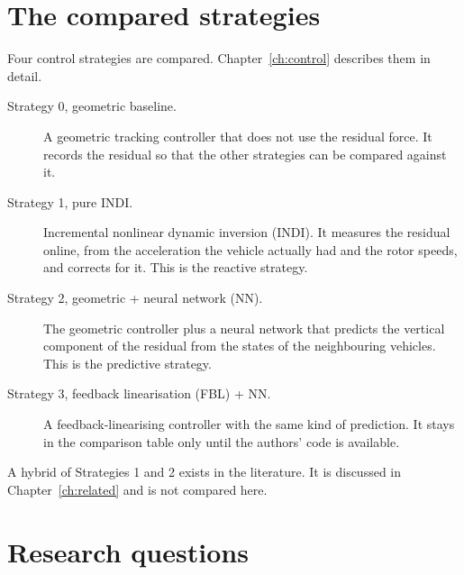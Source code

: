 \section{The compared strategies}
\label{sec:intro-strategies}

Four control strategies are compared. Chapter~\ref{ch:control} describes them in detail.

\begin{description}
  \item[Strategy 0, geometric baseline.] A geometric tracking controller that does not use the
    residual force. It records the residual so that the other strategies can be compared against it.
  \item[Strategy 1, pure INDI.] Incremental nonlinear dynamic inversion (INDI). It measures the
    residual online, from the acceleration the vehicle actually had and the rotor speeds, and
    corrects for it. This is the reactive strategy.
  \item[Strategy 2, geometric + neural network (NN).] The geometric controller plus a neural network
    that predicts the vertical component of the residual from the states of the neighbouring
    vehicles. This is the predictive strategy.
  \item[Strategy 3, feedback linearisation (FBL) + NN.] A feedback-linearising controller with the
    same kind of prediction. It stays in the comparison table only until the authors' code is
    available.
\end{description}

A hybrid of Strategies 1 and 2 exists in the literature. It is discussed in Chapter~\ref{ch:related}
and is not compared here.

\section{Research questions}
\label{sec:intro-rq}

